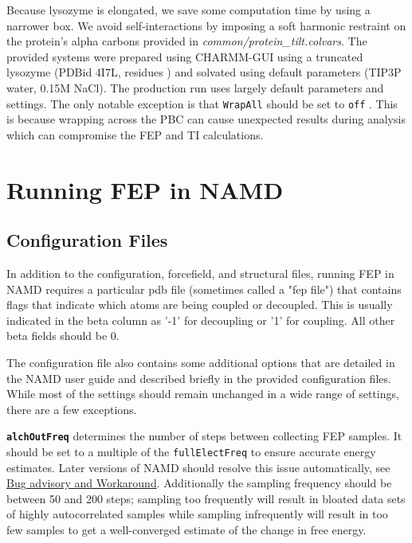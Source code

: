 \documentclass[9pt,tutorial]{Styling/livecoms}
\newcommand{\filepath}[1]{\textit{#1}}
\newcommand{\textInput}[1]{
  \texttt{#1}
}
\begin{document}
Because lysozyme is elongated, we save some computation time by using a narrower box. We avoid self-interactions by imposing a soft harmonic restraint on the protein's alpha carbons provided in \filepath{common/protein\_tilt.colvars}. \label{app:equilibration}
The provided systems were prepared using CHARMM-GUI\cite{Jo2008, Lee2016} using a truncated lysozyme (PDBid 4I7L, residues ) and solvated using default parameters (TIP3P water, 0.15M NaCl). 
The production run uses largely default parameters and settings. The only notable exception is that \textInput{WrapAll} should be set to \textInput{off}. 
This is because wrapping across the PBC can cause unexpected results during analysis which can compromise the FEP and TI calculations.

\section{Running FEP in NAMD}\label{app:FEPparameters}
\subsection{Configuration Files}
In addition to the configuration, forcefield, and structural files, running FEP in NAMD requires a particular pdb file (sometimes called a "fep file") that contains flags that indicate which atoms are being coupled or decoupled. This is usually indicated in the beta column as '-1' for decoupling or '1' for coupling. All other beta fields should be 0.

The configuration file also contains some additional options that are detailed in the NAMD user guide \cite{Bernardi2020} and described briefly in the provided configuration files. While most of the settings should remain unchanged in a wide range of settings, there are a few exceptions.

\textbf{\textInput{alchOutFreq}} determines the number of steps between collecting FEP samples. It should be set to a multiple of the \textInput{fullElectFreq} to ensure accurate energy estimates. Later versions of NAMD should resolve this issue automatically, see \href{https://www.ks.uiuc.edu/Research/namd/mailing_list/namd-l.2020-2021/1487.html}{Bug advisory and Workaround}. Additionally the sampling frequency should be between 50 and 200 steps; sampling too frequently will result in bloated data sets of highly autocorrelated samples while sampling infrequently will result in too few samples to get a well-converged estimate of the change in free energy.
\end{document}
